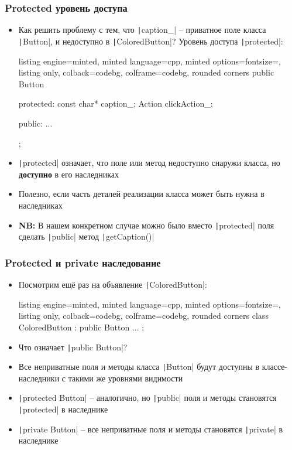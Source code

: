 \documentclass[10pt]{beamer}
\begin{document}
\begin{frame}[fragile]
\frametitle{Protected уровень доступа}
\begin{itemize}
\item Как решить проблему с тем, что \texttt|caption_| -- приватное поле класса \texttt|Button|, и недоступно в \texttt|ColoredButton|? \pause Уровень доступа \texttt|protected|:
\begin{tcblisting}{listing engine=minted, minted language=cpp, minted options={fontsize=\scriptsize}, listing only, colback=codebg, colframe=codebg, rounded corners}
public Button {
protected:
  const char* caption_;
  Action clickAction_;

public:
  ...
};
\end{tcblisting}
\pause
{}
\item \texttt|protected| означает, что поле или метод недоступно снаружи класса, но \textbf{доступно} в его наследниках
\pause
\item Полезно, если часть деталей реализации класса может быть нужна в наследниках
\pause
\item \textbf{NB:} В нашем конкретном случае можно было вместо \texttt|protected| поля сделать \texttt|public| метод \texttt|getCaption()|
\end{itemize}
\end{frame}

\begin{frame}[fragile]
\frametitle{Protected и private наследование}
\begin{itemize}
\item Посмотрим ещё раз на объявление \texttt|ColoredButton|:
\begin{tcblisting}{listing engine=minted, minted language=cpp, minted options={fontsize=\scriptsize}, listing only, colback=codebg, colframe=codebg, rounded corners}
class ColoredButton : public Button {
  ...
};
\end{tcblisting}
\pause
{}
\item Что означает \texttt|public Button|?
\pause
\item Все неприватные поля и методы класса \texttt|Button| будут доступны в классе-наследники с такими же уровнями видимости
\pause
\item \texttt|protected Button| -- аналогично, но \texttt|public| поля и методы становятся \texttt|protected| в наследнике
\pause
\item \texttt|private Button| -- все неприватные поля и методы становятся \texttt|private| в наследнике
\end{itemize}
\end{frame}
\end{document}
